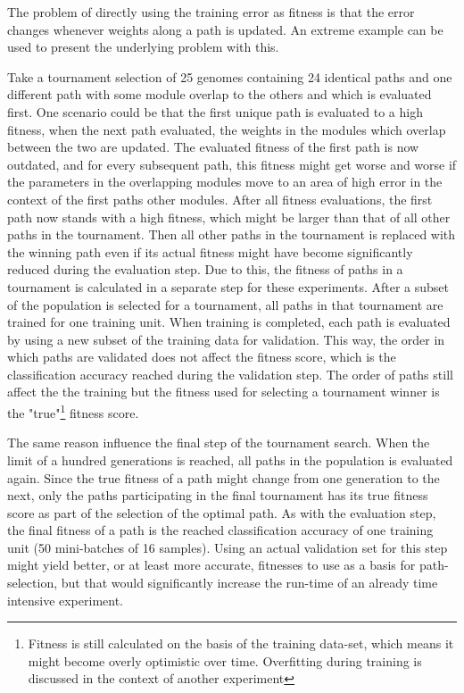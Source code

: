 The problem of directly using the training error as fitness is that the error changes whenever weights along a path is updated. An extreme example can be used to present the underlying problem with this. 

Take a tournament selection of 25 genomes containing 24 identical paths and one different path with some module overlap to the others and which is evaluated first. One scenario could be that the first unique path is evaluated to a high fitness, when the next path evaluated, the weights in the modules which overlap between the two are updated. The evaluated fitness of the first path is now outdated, and for every subsequent path, this fitness might get worse and worse if the parameters in the overlapping modules move to an area of high error in the context of the first paths other modules. After all fitness evaluations, the first path now stands with a high fitness, which might be larger than that of all other paths in the tournament. Then all other paths in the tournament is replaced with the winning path even if its actual fitness might have become significantly reduced during the evaluation step. Due to this, the fitness of paths in a tournament is calculated in a separate step for these experiments. After a subset of the population is selected for a tournament, all paths in that tournament are trained for one training unit. When training is completed, each path is evaluated by using a new subset of the training data for validation. This way, the order in which paths are validated does not affect the fitness score, which is the classification accuracy reached during the validation step. The order of paths still affect the the training but the fitness used for selecting a tournament winner is the "true"\footnote{Fitness is still calculated on the basis of the training data-set, which means it might become overly optimistic over time. Overfitting during training is discussed in the context of another experiment} fitness score.

The same reason influence the final step of the tournament search. When the limit of a hundred generations is reached, all paths in the population is evaluated again. Since the true fitness of a path might change from one generation to the next, only the paths participating in the final tournament has its true fitness score as part of the selection of the optimal path. As with the evaluation step, the final fitness of a path is the reached classification accuracy of one training unit (50 mini-batches of 16 samples). Using an actual validation set for this step might yield better, or at least more accurate, fitnesses to use as a basis for path-selection, but that would significantly increase the run-time of an already time intensive experiment. 

